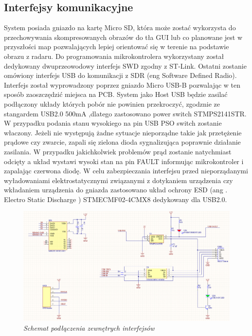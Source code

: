\documentclass[eng,printmode]{mgr}
\begin{document}
\subsection{Interfejsy komunikacyjne}
System posiada gniazdo na kartę Micro SD, która może zostać wykorzysta do przechowywania skompresowanych obrazów do tła GUI lub co planowane jest w przyszłości map pozwalających lepiej orientować się w terenie na podstawie obrazu z radaru. Do programowania mikrokontrolera wykorzystany został dedykowany dwuprzeowodowy interfejs SWD zgodny z ST-Link. Ostatni zostanie omówiony interfejs USB do komunikacji z SDR (eng Software Defined Radio). Interfejs został wyprowadzony poprzez gniazdo Micro USB-B pozwalając w ten sposób zaoszczędzić miejsca na PCB. System jako Host USB będzie zasilać podłączony układy których pobór nie powinien przekroczyć, zgodznie ze stangardem USB2.0 500mA ,dlatego zastosowano power switch STMPS2141STR. W przypadku podania stanu wysokiego na pin USB PSO switch zostanie właczony. Jeżeli nie występują żadne sytuacje nieporządne takie jak przetężenie prądowe czy zwarcie, zapali się zielona dioda sygnalizująca poprawnie działanie zasilania. W przypadku jakichkolwiek problemów prąd zostanie natychmiast odcięty a układ wystawi wysoki stan na pin FAULT informując mikrokontroler i zapalając czerwona diodę. W celu zabezpieczania interfejsu przed nieporządanymi wyładowaniami elektrostatycznymi związanymi z dotykaniem urządzenia czy wkładaniem urządzenia do gniazda zastosowano układ ochrony ESD (ang . Electro Static Discharge ) STMECMF02-4CMX8 dedykowany dla USB2.0.

\begin{figure}[!h]
    \centering
    \includegraphics[width=\textwidth]{schematics/conn.png}
    \caption{\textit{\scriptsize Schemat podłączenia zewnętrych interfejsów}}
\end{figure}
\end{document}
